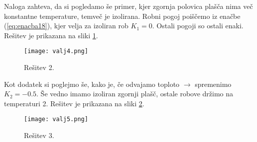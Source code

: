 \documentclass[12pt,a4paper]{article}
\begin{document}
\noindent Naloga zahteva, da si pogledamo še primer, kjer zgornja polovica plašča nima več konstantne temperature, temveč je izolirana. Robni pogoj poiščemo iz enačbe (\ref{eq:enacba18}), kjer velja za izoliran rob $K_1=0$. Ostali pogoji so ostali enaki. Rešitev je prikazana na sliki \ref{fig:slika13}.

\begin{figure}[H]
\begin{center}
\texttt{[image: valj4.png]}
\caption{Rešitev 2.} \label{fig:slika13}
\end{center}
\end{figure}

Kot dodatek si poglejmo še, kako je, če odvajamo toploto $\rightarrow$ spremenimo $K_2=-0.5$. Še vedno imamo izoliran zgornji plašč, ostale robove držimo na temperaturi 2. Rešitev je prikazana na sliki \ref{fig:slika14}.

\begin{figure}[H]
\begin{center}
\texttt{[image: valj5.png]}
\caption{Rešitev 3.} \label{fig:slika14}
\end{center}
\end{figure}
\end{document}
